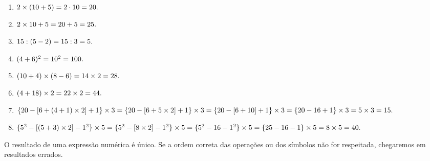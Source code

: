 \documentclass{article}
\begin{document}
\begin{enumerate}
    \item $2\times (10 + 5) \\
     =  2 \cdot 10 \\
     =20.$
    \item  $2 \times 10 + 5\\ 
     = 20 + 5 \\
      = 25.$
    \item  $15 : (5 - 2)\\ 
    = 15: 3 \\
     = 5.$
    \item  $(4 + 6)^2 \\
     = 10^2 \\
      = 100.$
    \item $ (10 + 4) \times (8 - 6) \\ 
     = 14 \times 2 \\
     = 28. $
    \item $(4 + 18) \times 2 \\
     = 22 \times 2 \\ 
      = 44. $
    \item $\{20 - [6 + (4+1)\times 2] + 1\}\times 3 \\
     = \{20 - [6 + 5\times 2] + 1\}\times 3 \\
     = \{20 - [6 + 10] + 1\}\times 3\\
     = \{20 - 16 + 1\}\times 3\\
     = 5 \times 3\\
      = 15.$
     
    \item $\{5^2 -  [(5+ 3) \times 2] - 1^2\}\times 5
     = \{5^2 -  [8 \times 2] - 1^2\}\times 5\\
      = \{5^2 -  16 - 1^2\}\times 5\\
       = \{25 -  16 - 1 \}\times 5\\
        =8\times 5  \\
         = 40.$
\end{enumerate}
O resultado de uma expressão numérica é único. Se a ordem correta das operações ou dos símbolos não for respeitada, chegaremos em resultados errados. 


\end{document}
